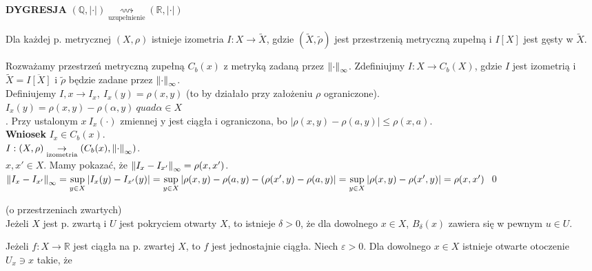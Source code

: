 \textbf{DYGRESJA} $(\mathbb{Q},| \cdot |) \underset{\text{uzupełnienie}}{\rightsquigarrow}(\mathbb{R},| \cdot |)$
\begin{tw} Dla każdej p. metrycznej $(X,\rho)$ istnieje izometria $I: X \rightarrow \widetilde{X}$, gdzie
    $(\widetilde{X},\widetilde{\rho})$ jest przestrzenią metryczną zupełną i $I[X]$ jest gęsty w $\widetilde{X}$.
\end{tw} 
\begin{dd} Rozważamy przestrzeń metryczną zupełną $C_b(x)$ z metryką zadaną przez $\left\lVert\cdot\right\rVert_\infty$. 
    Zdefiniujmy $I: X \rightarrow C_b(X)$, gdzie $I$ jest izometrią i $\widetilde{X} = \overline{I[X]}$ 
    i $\widetilde{\rho}$ będzie zadane przez $\left\lVert\cdot\right\rVert_\infty$. \\ 
    Definiujemy $I, x \rightarrow I_x, \ I_x(y) = \rho(x,y)$ (to by działało przy założeniu $\rho$ ograniczone). \\
    $I_x(y) = \rho(x,y) - \rho(\alpha,y) \ quad \alpha \in X$ \\. 
    Przy ustalonym $x \ I_x(\cdot)$ zmiennej y jest ciągła i ograniczona, bo $|\rho(x,y)-\rho(a,y)| \le \rho(x,a)$. \\
    \textbf{Wniosek} $I_x \in C_b(x)$. \\ 
    $I : (X,\rho) \underset{\text{izometria}}{\to} (C_b(x),\left\lVert\cdot\right\rVert_\infty) $. \\ 
    $x,x' \in X$. Mamy pokazać, że $\left\lVert I_x - I_{x'}\right\rVert_\infty = \rho(x,x')$. \\ 
    $\left\lVert I_x - I_{x'}\right\rVert_\infty = \sup\limits_{y \in X}|I_x(y) - I_{x'}(y)|=\sup\limits_{y \in X}
    |\rho(x,y)-\rho(a,y)-(\rho(x',y)-\rho(a,y)| = \sup\limits_{y\in X}|\rho(x,y)-\rho(x',y)| = \rho(x,x')$
    \hfill \qed
\end{dd} 
\begin{ft} (o przestrzeniach zwartych) \\
Jeżeli $X$ jest p. zwartą i $U$ jest pokryciem otwarty $X$, to istnieje $\delta > 0$, że dla 
dowolnego $x \in X$, $B_\delta(x)$ zawiera się w pewnym $u \in U$.
\end{ft} 
\begin{wn} Jeżeli $f: X \to \mathbb{R}$ jest ciągła na p. zwartej $X$, to 
    $f$ jest jednostajnie ciągła. Niech $\varepsilon > 0$. Dla dowolnego $x \in X$ istnieje otwarte otoczenie 
    $U_x \ni x$ takie, że
\end{wn}
